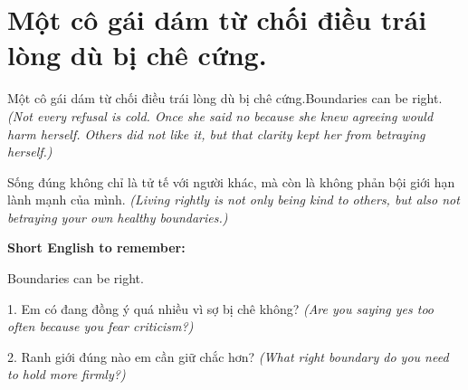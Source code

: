 \section{Một cô gái dám từ chối điều trái lòng dù bị chê cứng.}
\begin{truyen}{Một cô gái dám từ chối điều trái lòng dù bị chê cứng.}{Boundaries can be right.}
\textit{(Not every refusal is cold. Once she said no because she knew agreeing would harm herself. Others did not like it, but that clarity kept her from betraying herself.)}
\end{truyen}
\begin{baihoc}
Sống đúng không chỉ là tử tế với người khác, mà còn là không phản bội giới hạn lành mạnh của mình.
\textit{(Living rightly is not only being kind to others, but also not betraying your own healthy boundaries.)}
\end{baihoc}
\begin{ghinhoanh}\textbf{Short English to remember:}

Boundaries can be right.
\end{ghinhoanh}
\begin{tuhocnhanh}
1. Em có đang đồng ý quá nhiều vì sợ bị chê không? \textit{(Are you saying yes too often because you fear criticism?)}

2. Ranh giới đúng nào em cần giữ chắc hơn? \textit{(What right boundary do you need to hold more firmly?)}
\end{tuhocnhanh}
\ngancach

